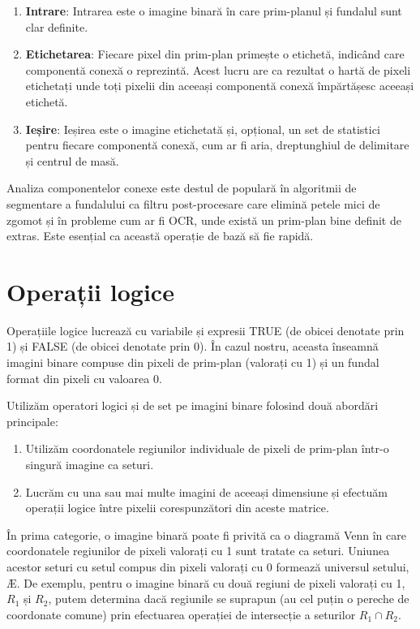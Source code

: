 \documentclass[a4paper,12pt]{report}
\begin{document}
\begin{enumerate}
    \item \textbf{Intrare}: Intrarea este o imagine binară în care prim-planul și fundalul sunt clar definite.
    \item \textbf{Etichetarea}: Fiecare pixel din prim-plan primește o etichetă, indicând care componentă conexă o reprezintă. Acest lucru are ca rezultat o hartă de pixeli etichetați unde toți pixelii din aceeași componentă conexă împărtășesc aceeași etichetă.
    \item \textbf{Ieșire}: Ieșirea este o imagine etichetată și, opțional, un set de statistici pentru fiecare componentă conexă, cum ar fi aria, dreptunghiul de delimitare și centrul de masă.
\end{enumerate}
Analiza componentelor conexe este destul de populară în algoritmii de segmentare a fundalului ca filtru post-procesare care elimină petele mici de zgomot și în probleme cum ar fi OCR, unde există un prim-plan bine definit de extras. Este esențial ca această operație de bază să fie rapidă.

\section{Operații logice}
Operațiile logice lucrează cu variabile și expresii TRUE (de obicei denotate prin 1) și FALSE (de obicei denotate prin 0). În cazul nostru, aceasta înseamnă imagini binare compuse din pixeli de prim-plan (valorați cu 1) și un fundal format din pixeli cu valoarea 0.

Utilizăm operatori logici și de set pe imagini binare folosind două abordări principale:
\begin{enumerate}
    \item Utilizăm coordonatele regiunilor individuale de pixeli de prim-plan într-o singură imagine ca seturi.
    \item Lucrăm cu una sau mai multe imagini de aceeași dimensiune și efectuăm operații logice între pixelii corespunzători din aceste matrice.
\end{enumerate}

În prima categorie, o imagine binară poate fi privită ca o diagramă Venn în care coordonatele regiunilor de pixeli valorați cu 1 sunt tratate ca seturi. Uniunea acestor seturi cu setul compus din pixeli valorați cu 0 formează universul setului, Æ. De exemplu, pentru o imagine binară cu două regiuni de pixeli valorați cu 1, $R_1$ și $R_2$, putem determina dacă regiunile se suprapun (au cel puțin o pereche de coordonate comune) prin efectuarea operației de intersecție a seturilor $R_1 \cap R_2$.
\end{document}
